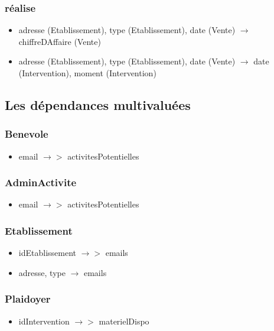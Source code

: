  
\subsubsection*{réalise}
\begin{itemize}
\item[] adresse (Etablissement), type (Etablissement), date (Vente) $\rightarrow$ chiffreDAffaire (Vente)
\item[] adresse (Etablissement), type (Etablissement), date (Vente) $\rightarrow$ date (Intervention), moment (Intervention)
\end{itemize}

\subsection{Les dépendances multivaluées}

\subsubsection*{Benevole}
\begin{itemize}
\item[] email $\rightarrow > $ activitesPotentielles 
\end{itemize}

\subsubsection*{AdminActivite}
\begin{itemize}
\item[]email $\rightarrow >$ activitesPotentielles 
\end{itemize}

\subsubsection*{Etablissement}
\begin{itemize}
\item[] idEtablissement $\rightarrow >$ emails
\item[] adresse, type $\rightarrow$ emails
\end{itemize}

\subsubsection*{Plaidoyer}
\begin{itemize}
\item[]	idIntervention $\rightarrow >$ materielDispo
\end{itemize}

